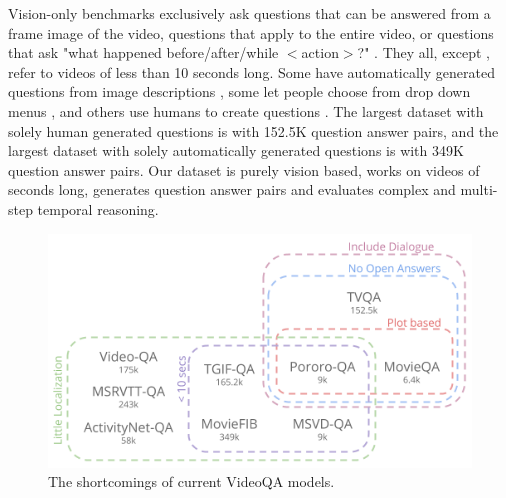 \documentclass[10pt,twocolumn,letterpaper]{article}
\newcommand{\mgm}[1]{{\color{cyan}{mgm: #1}}}
\begin{document}
Vision-only benchmarks exclusively ask questions that can be answered from a frame image of the video,  questions that apply to the entire video, or questions that ask "what happened before/after/while $<$action$>$?" \mgm{is there a better way to explain this type of question?}. They all, except \cite{yu2019activitynet, xu2017video}, refer to videos of less than 10 seconds long.  Some have automatically generated questions from image descriptions \cite{xu2017video,zeng2016leveraging}, some let people choose from drop down menus \cite{jang2017tgif}, and others use humans to create questions \cite{yu2019activitynet, tapaswi2016movieqa, jang2017tgif, lei2018tvqa}. The largest dataset with solely human generated questions is \cite{lei2018tvqa} with 152.5K question answer pairs, and the largest dataset with solely automatically generated questions is \cite{maharaj2017dataset} with 349K question answer pairs. Our dataset is purely vision based, works on videos of \mgm{30-90} seconds long, generates \mgm{add here} question answer pairs and evaluates complex and multi-step temporal reasoning.

\begin{figure}[t]
\begin{center}
\includegraphics[width=0.8\linewidth]{Figures/figure_videoQA.png}
\end{center}
   \caption{The shortcomings of current VideoQA models.}
\label{fig:long}
\label{fig:onecol}
\end{figure}

\end{document}
